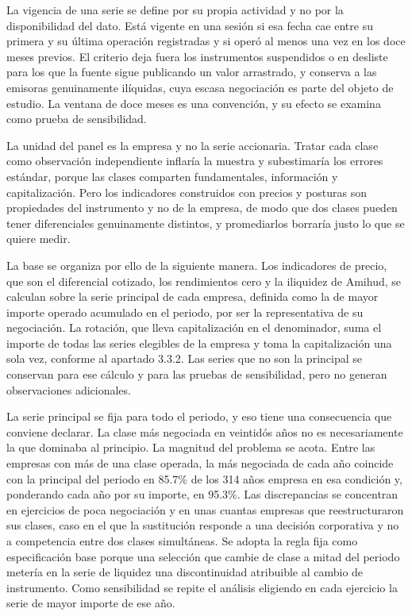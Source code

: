 La vigencia de una serie se define por su propia actividad y no por la disponibilidad del dato. Está vigente en una sesión si esa fecha cae entre su primera y su última operación registradas y si operó al menos una vez en los doce meses previos. El criterio deja fuera los instrumentos suspendidos o en desliste para los que la fuente sigue publicando un valor arrastrado, y conserva a las emisoras genuinamente ilíquidas, cuya escasa negociación es parte del objeto de estudio. La ventana de doce meses es una convención, y su efecto se examina como prueba de sensibilidad.

La unidad del panel es la empresa y no la serie accionaria. Tratar cada clase como observación independiente inflaría la muestra y subestimaría los errores estándar, porque las clases comparten fundamentales, información y capitalización. Pero los indicadores construidos con precios y posturas son propiedades del instrumento y no de la empresa, de modo que dos clases pueden tener diferenciales genuinamente distintos, y promediarlos borraría justo lo que se quiere medir.

La base se organiza por ello de la siguiente manera. Los indicadores de precio, que son el diferencial cotizado, los rendimientos cero y la iliquidez de Amihud, se calculan sobre la serie principal de cada empresa, definida como la de mayor importe operado acumulado en el periodo, por ser la representativa de su negociación. La rotación, que lleva capitalización en el denominador, suma el importe de todas las series elegibles de la empresa y toma la capitalización una sola vez, conforme al apartado 3.3.2. Las series que no son la principal se conservan para ese cálculo y para las pruebas de sensibilidad, pero no generan observaciones adicionales.

La serie principal se fija para todo el periodo, y eso tiene una consecuencia que conviene declarar. La clase más negociada en veintidós años no es necesariamente la que dominaba al principio. La magnitud del problema se acota. Entre las empresas con más de una clase operada, la más negociada de cada año coincide con la principal del periodo en 85.7\% de los 314 años empresa en esa condición y, ponderando cada año por su importe, en 95.3\%. Las discrepancias se concentran en ejercicios de poca negociación y en unas cuantas empresas que reestructuraron sus clases, caso en el que la sustitución responde a una decisión corporativa y no a competencia entre dos clases simultáneas. Se adopta la regla fija como especificación base porque una selección que cambie de clase a mitad del periodo metería en la serie de liquidez una discontinuidad atribuible al cambio de instrumento. Como sensibilidad se repite el análisis eligiendo en cada ejercicio la serie de mayor importe de ese año.

